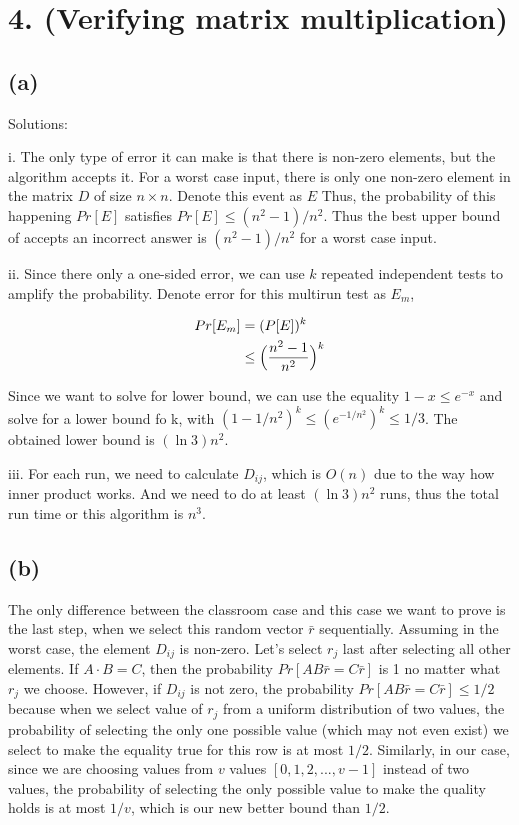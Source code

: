 \documentclass[10pt]{537homework}
\author{Peilun Dai}
\begin{document}
\section*{4. (Verifying matrix multiplication) }

\subsection*{(a)} Solutions: 

i. The only type of error it can make is that there is non-zero elements, but the algorithm accepts it. For a worst case input, there is only one non-zero element in the matrix $D$ of size $n\times n$. Denote this event as $E$ Thus, the probability of this happening $Pr[E]$ satisfies $Pr[E] \leq (n^2-1)/n^2$. Thus the best upper bound of accepts an incorrect answer is $(n^2-1)/n^2$ for a worst case input. 

ii. Since there only a one-sided error, we can use $k$ repeated independent tests to amplify the probability. Denote error for this multirun test as $E_m$,

\begin{align}
	Pr[E_m] 	& = (P[E])^k \\
				& \leq \Big( {n^2 - 1 \over n^2} \Big)^k   
\end{align}

Since we want to solve for lower bound, we can use the equality $1-x \leq e^{-x}$ and solve for a lower bound fo k, with $(1-1/n^2)^k \leq (e^{-1/n^2})^k \leq 1/3$. The obtained lower bound is $(\ln{3})n^2$. 

iii. For each run, we need to calculate $D_{ij}$, which is $O(n)$ due to the way how inner product works. And we need to do at least $(\ln{3})n^2$ runs, thus the total run time or this algorithm is $n^3$. 



\subsection*{(b)} \proof The only difference between the classroom case and this case we want to prove is the last step, when we select this random vector $\bar{r}$ sequentially. Assuming in the worst case, the element $D_{ij}$ is non-zero. Let's select $r_j$ last after selecting all other elements. If $A\cdot B = C$, then the probability $Pr[AB\bar{r} = C\bar{r}] $ is 1 no matter what $r_j$ we choose. However, if $D_{ij}$ is not zero, the probability $Pr[AB\bar{r} = C\bar{r}] \leq 1/2$ because when we select value of $r_j$ from a uniform distribution of two values, the probability of selecting the only one possible value (which may not even exist) we select to make the equality true for this row is at most $1/2$. Similarly, in our case, since we are choosing values from $v$ values $[0, 1, 2, ..., v-1]$ instead of two values, the probability of selecting the only possible value to make the quality holds is at most $1/v$, which is our new better bound than $1/2$.
\end{document}
